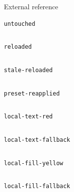 \documentclass{article}
\begin{document}

\noindent External reference\par
{}
\par\noindent\texttt{untouched}\par
\[\]

\par\noindent\texttt{reloaded}\par
\[\]

\par\noindent\texttt{stale-reloaded}\par
\[\]

\par\noindent\texttt{preset-reapplied}\par
\[\]

\par\noindent\texttt{local-text-red}\par
\[\]

\par\noindent\texttt{local-text-fallback}\par
\[\]

\par\noindent\texttt{local-fill-yellow}\par
\[\]

\par\noindent\texttt{local-fill-fallback}\par
\[\]
\end{document}
